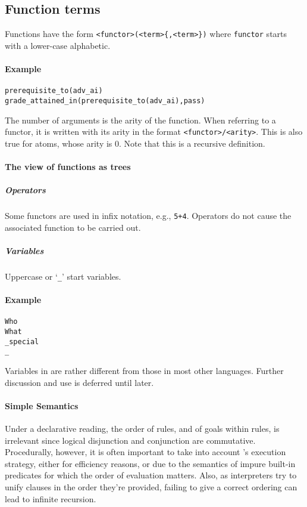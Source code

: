 \documentclass[thesis-solanki.tex]{subfiles}
\begin{document}
\subsection{Function terms}

Functions have the form \Verb!<functor>(<term>{,<term>})!
where \Verb!functor! starts with a lower-case alphabetic. 
\paragraph{Example}
\par
\begin{verbatim}
prerequisite_to(adv_ai)
grade_attained_in(prerequisite_to(adv_ai),pass)
\end{verbatim}
     
The number of arguments is the arity of the function. When referring to a functor, it is written with its arity in
the format \Verb!<functor>/<arity>!. This is also true for atoms, whose arity is 0.
Note that this is a recursive definition.
\paragraph{The view of functions as trees}
\subparagraph{Operators}
Some functors are used in infix notation, e.g., \Verb!5+4!.
Operators do not cause the associated function to be carried out.
\subparagraph{Variables}

Uppercase or `\Verb!_!' start variables.
\paragraph{Example}
\begin{verbatim}
Who
What
_special
_
\end{verbatim}
     
Variables in  are rather different from those in most other languages. Further discussion and use is deferred until later.


\paragraph{Simple Semantics}

Under a declarative reading, the order of rules, and of goals within rules, is irrelevant since logical disjunction and conjunction are 
commutative.
Procedurally, however, it is often important to take into account 's execution strategy, either
for efficiency reasons, or due to the semantics of impure built-in predicates for which the order of evaluation
matters.
Also, as  interpreters try to unify clauses in the order they're provided, failing to give a
correct ordering can lead to infinite recursion.
\end{document}

